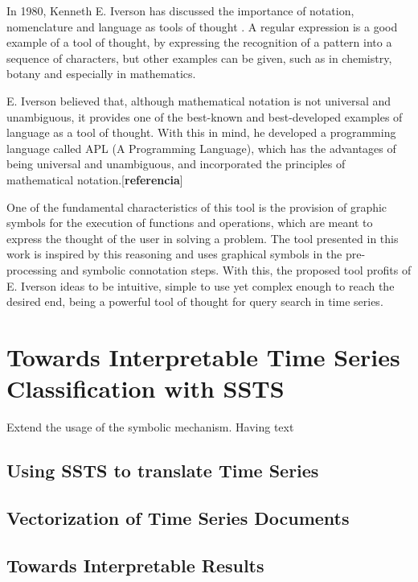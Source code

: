 In 1980, Kenneth E. Iverson has discussed the importance of notation, nomenclature and language as tools of thought \citep{APL1}. A regular expression is a good example of a tool of thought, by expressing the recognition of a pattern into a sequence of characters, but other examples can be given, such as in chemistry, botany and especially in mathematics. 
\par
E. Iverson believed that, although mathematical notation is not universal and unambiguous, it provides one of the best-known and best-developed examples of language as a tool of thought. With this in mind, he developed a programming language called APL (A Programming Language), which has the advantages of being universal and unambiguous, and incorporated the principles of mathematical notation.[\textbf{referencia}]
\par
One of the fundamental characteristics of this tool is the provision of graphic symbols for the execution of functions and operations, which are meant to express the thought of the user in solving a problem. The tool presented in this work is inspired by this reasoning and uses graphical symbols in the pre-processing and symbolic connotation steps. With this, the proposed tool profits of E. Iverson ideas to be intuitive, simple to use yet complex enough to reach the desired end, being a powerful tool of thought for query search in time series. 






\section{Towards Interpretable Time Series Classification with SSTS}

Extend the usage of the symbolic mechanism. Having text 

\subsection{Using SSTS to translate Time Series}

\subsection{Vectorization of Time Series Documents}

\subsection{Towards Interpretable Results}


